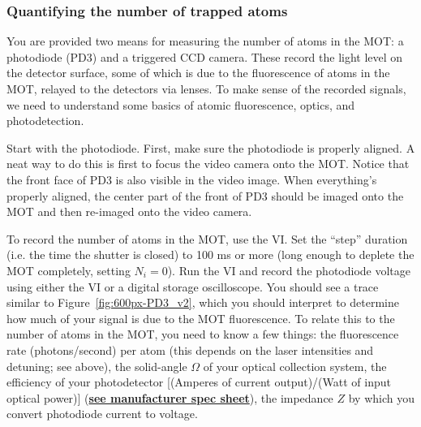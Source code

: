 \documentclass{../lab}
\begin{document}
\subsubsection{Quantifying the number of trapped atoms}

You are provided two means for measuring the number of atoms in the MOT: a photodiode (PD3) and a triggered CCD camera. These record the light level on the detector surface, some of which is due to the fluorescence of atoms in the MOT, relayed to the detectors via lenses. To make sense of the recorded signals, we need to understand some basics of atomic fluorescence, optics, and photodetection.

Start with the photodiode. First, make sure the photodiode is properly aligned. A neat way to do this is first to focus the video camera onto the MOT. Notice that the front face of PD3 is also visible in the video image. When everything's properly aligned, the center part of the front of PD3 should be imaged onto the MOT and then re-imaged onto the video camera.

To record the number of atoms in the MOT, use the VI. Set the ``step'' duration (i.e. the time the shutter is closed) to 100 ms or more (long enough to deplete the MOT completely, setting $N_i = 0$). Run the VI and record the photodiode voltage using either the VI or a digital storage oscilloscope. You should see a trace similar to Figure~\ref{fig:600px-PD3_v2}, which you should interpret to determine how much of your signal is due to the MOT fluorescence. To relate this to the number of atoms in the MOT, you need to know a few things: the fluorescence rate (photons/second) per atom (this depends on the laser intensities and detuning; see above), the solid-angle $\Omega$ of your optical collection system, the efficiency of your photodetector [(Amperes of current output)/(Watt of input optical power)] (\href{http://experimentationlab.berkeley.edu/sites/default/files/images/Photodiode\_info.pdf}{\textbf{see manufacturer spec sheet}}), the impedance $Z$ by which you convert photodiode current to voltage.
\end{document}

